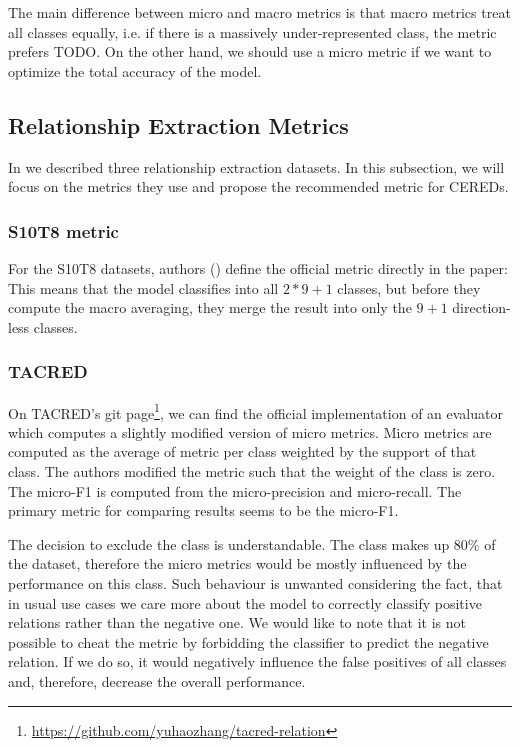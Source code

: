 The main difference between micro and macro metrics is that macro metrics treat all classes equally, i.e. if there is a massively under-represented class, the metric prefers TODO. On the other hand, we should use a micro metric if we want to optimize the total accuracy of the model.

\subsection{Relationship Extraction Metrics}

In  we described three relationship extraction datasets. In this subsection, we will focus on the metrics they use and propose the recommended metric for CEREDs.

\subsubsection{S10T8 metric}
For the S10T8 datasets, authors (\cite{semeval}) define the official metric directly in the paper:  This means that the model classifies into all $2*9+1$ classes, but before they compute the macro averaging, they merge the result into only the $9+1$ direction-less classes.

\subsubsection{TACRED}
On TACRED's git page\footnote{\url{https://github.com/yuhaozhang/tacred-relation}}, we can find the official implementation of an evaluator which computes a slightly modified version of micro metrics. Micro metrics are computed as the average of metric per class weighted by the support of that class. The authors modified the metric such that the weight of the  class is zero. The micro-F1 is computed from the micro-precision and micro-recall. The primary metric for comparing results seems to be the micro-F1.

The decision to exclude the  class is understandable. The class makes up 80\% of the dataset, therefore the micro metrics would be mostly influenced by the performance on this class. Such behaviour is unwanted considering the fact, that in usual use cases we care more about the model to correctly classify positive relations rather than the negative one. We would like to note that it is not possible to cheat the metric by forbidding the classifier to predict the negative relation. If we do so, it would negatively influence the false positives of all classes and, therefore, decrease the overall performance.



